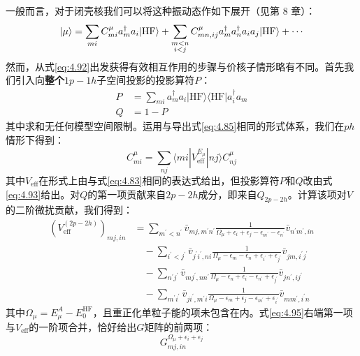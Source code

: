 一般而言，对于闭壳核我们可以将这种振动态作如下展开（见第 8 章）：
\begin{equation}
|\mu\rangle=\sum_{mi}C^{\mu}_{mi}a^{\dagger}_{m}a_{i}|\text{HF}\rangle+\sum_{\begin{subarray}{c}
m<n\\
i<j
\end{subarray}}C^{\mu}_{mn,ij}a^{\dagger}_{m}a^{\dagger}_{n}a_{i}a_{j}|\text{HF}\rangle+\cdots\label{eq:4.92}
\end{equation}
然而，从式\ref{eq:4.92}出发获得有效相互作用的步骤与价核子情形略有不同。首先我们引入向\textbf{整个}$1p-1h$子空间投影的投影算符$P$：
\begin{align}
P & =\sum_{mi}a^{\dagger}_{m}a_{i}|\text{HF}\rangle\langle\text{HF}|a^{\dagger}_{i}a_{m}\label{eq:4.93}\\
Q & =1-P\nonumber 
\end{align}
其中求和无任何模型空间限制。运用与导出式\ref{eq:4.85}相同的形式体系，我们在$ph$情形下得到：
\begin{equation}
[E_{\mu}-E^{\text{HF}}_{0}-\epsilon_{m}+\epsilon_{i}]C^{\mu}_{mi}=\sum_{nj}\langle mi|V^{E_{\mu}}_{\text{eff}}|nj\rangle C^{\mu}_{nj}\label{eq:4.94}
\end{equation}
其中$V_{\text{eff}}$在形式上由与式\ref{eq:4.83}相同的表达式给出，但投影算符$P$和$Q$改由式\ref{eq:4.93}给出。对$Q$的第一项贡献来自$2p-2h$成分，即来自$Q_{2p-2h}$。计算该项对$V$的二阶微扰贡献，我们得到：
\begin{align}
(V^{(2p-2h)}_{\text{eff}})_{mj,in} & =\sum_{m^{\prime}<n^{\prime}}\bar{v}_{mj,m^{\prime}n^{\prime}}\frac{1}{\Omega_{\mu}+\epsilon_{i}+\epsilon_{j}-\epsilon_{m^{\prime}}-\epsilon_{n^{\prime}}}\bar{v}_{n^{\prime}m^{\prime},in}\nonumber \\
 & \quad-\sum_{i^{\prime}<j^{\prime}}\bar{v}_{j^{\prime}i^{\prime},ni}\frac{1}{\Omega_{\mu}-\epsilon_{m}-\epsilon_{n}+\epsilon_{i^{\prime}}+\epsilon_{j^{\prime}}}\bar{v}_{jm,i^{\prime}j^{\prime}}\nonumber \\
 & \quad-\sum_{n^{\prime}j^{\prime}}\bar{v}_{mj^{\prime},nn^{\prime}}\frac{1}{\Omega_{\mu}-\epsilon_{n}+\epsilon_{i}-\epsilon_{n^{\prime}}+\epsilon_{j^{\prime}}}\bar{v}_{jn^{\prime},ij^{\prime}}\nonumber \\
 & \quad-\sum_{m^{\prime}i^{\prime}}\bar{v}_{ji^{\prime},m^{\prime}i}\frac{1}{\Omega_{\mu}-\epsilon_{m}+\epsilon_{j}-\epsilon_{m^{\prime}}+\epsilon_{i^{\prime}}}\bar{v}_{mm^{\prime},i^{\prime}n}\label{eq:4.95}
\end{align}
其中$\Omega_{\mu}=E^{A}_{\mu}-E^{\text{HF}}_{0}$，且重正化单粒子能的项未包含在内。式\ref{eq:4.95}右端第一项与$V_{\text{eff}}$的一阶项合并，恰好给出$G$矩阵的前两项：
\begin{equation}
G^{\Omega_{\mu}+\epsilon_{i}+\epsilon_{j}}_{mj,in}\label{eq:4.96}
\end{equation}

